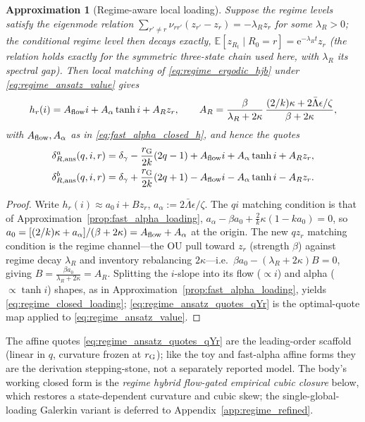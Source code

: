 \documentclass[11pt,a4paper]{article}
\newcommand{\E}{\mathbb{E}}
\newcommand{\e}{\mathrm e}
\theoremstyle{plain}
\newtheorem{approximation}[proposition]{Approximation}
\theoremstyle{definition}
\begin{document}
\begin{approximation}[Regime-aware local loading]
\label{prop:regime_loading}
Suppose the regime levels satisfy the eigenmode relation
\(\sum_{r'\ne r}\nu_{rr'}(z_{r'}-z_r)=-\lambda_R z_r\) for some
\(\lambda_R>0\); the conditional regime level then decays exactly,
\(\E[z_{R_t}\mid R_0=r]=\e^{-\lambda_R t}z_r\) (the relation holds exactly for
the symmetric three-state chain used here, with \(\lambda_R\) its spectral gap).
Then local matching of \eqref{eq:regime_ergodic_hjb} under
\eqref{eq:regime_ansatz_value} gives
\begin{equation}
h_r(i)=A_{\rm flow}i+A_\alpha\tanh i+A_R z_r,
\qquad
A_R=\frac{\beta}{\lambda_R+2\kappa}\,
\frac{(2/k)\kappa+2\bar\Lambda\epsilon/\zeta}{\beta+2\kappa},
\label{eq:regime_closed_loading}
\end{equation}
with \(A_{\rm flow},A_\alpha\) as in \eqref{eq:fast_alpha_closed_h},
and hence the quotes
\begin{align}
\delta_{R,\mathrm{ans}}^a(q,i,r)
&=\delta_\gamma-\frac{r_{\rm G}}{2k}(2q-1)+A_{\rm flow}i+A_\alpha\tanh i+A_Rz_r,
\notag\\
\delta_{R,\mathrm{ans}}^b(q,i,r)
&=\delta_\gamma+\frac{r_{\rm G}}{2k}(2q+1)-A_{\rm flow}i-A_\alpha\tanh i-A_Rz_r.
\label{eq:regime_ansatz_quotes_qYr}
\end{align}
\end{approximation}

\begin{proof}
Write \(h_r(i)\approx a_0\,i+B z_r\),
\(a_\alpha:=2\bar\Lambda\epsilon/\zeta\).
The \(qi\) matching condition is that of Approximation~\ref{prop:fast_alpha_loading},
\(a_\alpha-\beta a_0+\tfrac{2}{k}\kappa(1-ka_0)=0\), so
\(a_0=[(2/k)\kappa+a_\alpha]/(\beta+2\kappa)=A_{\rm flow}+A_\alpha\) at the origin.
The new \(qz_r\) matching condition is the regime channel---the OU pull toward \(z_r\)
(strength \(\beta\)) against regime decay \(\lambda_R\) and inventory
rebalancing \(2\kappa\)---i.e.\ \(\beta a_0-(\lambda_R+2\kappa)B=0\), giving
\(B=\tfrac{\beta a_0}{\lambda_R+2\kappa}=A_R\).  Splitting the \(i\)-slope into its
flow (\(\propto i\)) and alpha (\(\propto\tanh i\)) shapes, as in
Approximation~\ref{prop:fast_alpha_loading}, yields
\eqref{eq:regime_closed_loading}; \eqref{eq:regime_ansatz_quotes_qYr} is the
optimal-quote map applied to \eqref{eq:regime_ansatz_value}.
\end{proof}

The affine quotes \eqref{eq:regime_ansatz_quotes_qYr} are the leading-order
scaffold (linear in \(q\), curvature frozen at \(r_{\rm G}\)); like the toy and
fast-alpha affine forms they are the derivation stepping-stone, not a separately
reported model.  The body's working closed form is the \emph{regime hybrid
flow-gated empirical cubic closure} below, which restores a state-dependent
curvature and cubic skew; the single-global-loading Galerkin variant is
deferred to Appendix~\ref{app:regime_refined}.
\end{document}
